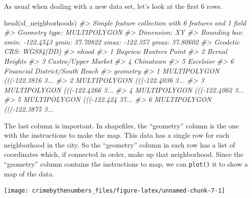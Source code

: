 \documentclass[
  12pt,
  openany]{book}
\newenvironment{Shaded}{\begin{snugshade}}{\end{snugshade}}
\newcommand{\CommentTok}[1]{\textcolor[rgb]{0.37,0.37,0.37}{\textit{#1}}}
\newcommand{\FunctionTok}[1]{\textcolor[rgb]{0,0,0}{#1}}
\newcommand{\NormalTok}[1]{#1}
\newcommand{\SpecialCharTok}[1]{\textcolor[rgb]{0,0,0}{#1}}
\begin{document}
As usual when dealing with a new data set, let's look at the first 6 rows.

\begin{Shaded}
\begin{Highlighting}[]
\FunctionTok{head}\NormalTok{(sf\_neighborhoods)}
\CommentTok{\#\textgreater{} Simple feature collection with 6 features and 1 field}
\CommentTok{\#\textgreater{} Geometry type: MULTIPOLYGON}
\CommentTok{\#\textgreater{} Dimension:     XY}
\CommentTok{\#\textgreater{} Bounding box:  xmin: {-}122.4543 ymin: 37.70822 xmax: {-}122.357 ymax: 37.80602}
\CommentTok{\#\textgreater{} Geodetic CRS:  WGS84(DD)}
\CommentTok{\#\textgreater{}                            nhood}
\CommentTok{\#\textgreater{} 1          Bayview Hunters Point}
\CommentTok{\#\textgreater{} 2                 Bernal Heights}
\CommentTok{\#\textgreater{} 3            Castro/Upper Market}
\CommentTok{\#\textgreater{} 4                      Chinatown}
\CommentTok{\#\textgreater{} 5                      Excelsior}
\CommentTok{\#\textgreater{} 6 Financial District/South Beach}
\CommentTok{\#\textgreater{}                         geometry}
\CommentTok{\#\textgreater{} 1 MULTIPOLYGON ((({-}122.3816 3...}
\CommentTok{\#\textgreater{} 2 MULTIPOLYGON ((({-}122.4036 3...}
\CommentTok{\#\textgreater{} 3 MULTIPOLYGON ((({-}122.4266 3...}
\CommentTok{\#\textgreater{} 4 MULTIPOLYGON ((({-}122.4062 3...}
\CommentTok{\#\textgreater{} 5 MULTIPOLYGON ((({-}122.424 37...}
\CommentTok{\#\textgreater{} 6 MULTIPOLYGON ((({-}122.3875 3...}
\end{Highlighting}
\end{Shaded}

The last column is important. In shapefiles, the ``geometry'' column is the one with the instructions to make the map. This data has a single row for each neighborhood in the city. So the ``geometry'' column in each row has a list of coordinates which, if connected in order, make up that neighborhood. Since the ``geometry'' column contains the instructions to map, we can \texttt{plot()} it to show a map of the data.

\begin{Shaded}
\end{Shaded}

\begin{center}\texttt{[image: crimebythenumbers\_files/figure-latex/unnamed-chunk-7-1]} \end{center}
\end{document}
